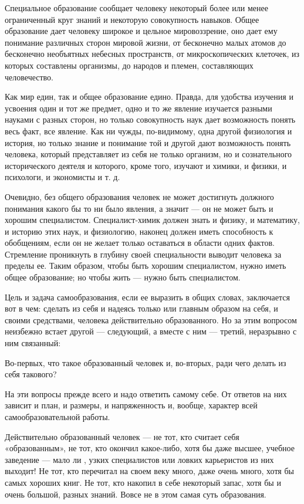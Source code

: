 Специальное образование сообщает человеку некоторый более или менее ограниченный круг знаний и некоторую совокупность навыков. Общее образование дает человеку широкое и цельное мировоззрение, оно дает ему понимание различных сторон мировой жизни, от бесконечно малых атомов до бесконечно необъятных небесных пространств, от микроскопических клеточек, из которых составлены организмы, до народов и племен, составляющих человечество.

Как мир един, так и общее образование едино. Правда, для удобства изучения и усвоения один и тот же предмет, одно и то же явление изучается разными науками с разных сторон, но только совокупность наук дает возможность понять весь факт, все явление. Как ни чужды, по-видимому, одна другой физиология и история, но только знание и понимание той и другой дают возможность понять человека, который представляет из себя не только организм, но и сознательного исторического деятеля и которого, кроме того, изучают и химики, и физики, и психологи, и экономисты и т. д.

Очевидно, без общего образования человек не может достигнуть должного понимания какого бы то ни было явления, а значит --- он не может быть и хорошим специалистом. Специалист-химик должен знать и физику, и математику, и историю этих наук, и физиологию, наконец должен иметь способность к обобщениям, если он не желает только оставаться в области одних фактов. Стремление проникнуть в глубину своей специальности выводит человека за пределы ее. Таким образом, чтобы быть хорошим специалистом, нужно иметь общее образование; но чтобы жить --- нужно быть специалистом.

Цель и задача самообразования, если ее выразить в общих словах, заключается вот в чем: сделать из себя и надеясь только или главным образом на себя, и своими средствами, человека действительно образованного. Но за этим вопросом неизбежно встает другой --- следующий, а вместе с ним --- третий, неразрывно с ним связанный:

Во-первых, что такое образованный человек и, во-вторых, ради чего делать из себя такового?

На эти вопросы прежде всего и надо ответить самому себе. От ответов на них зависит и план, и размеры, и напряженность и, вообще, характер всей самообразовательной работы.

Действительно образованный человек --- не тот, кто считает себя «образованным», не тот, кто окончил какое-либо, хотя бы даже высшее, учебное заведение --- мало ли , узких специалистов или ловких карьеристов из них выходит! Не тот, кто перечитал на своем веку много, даже очень много, хотя бы самых хороших книг. Не тот, кто накопил в себе некоторый запас, хотя бы и очень большой, разных знаний. Вовсе не в этом самая суть образования.

